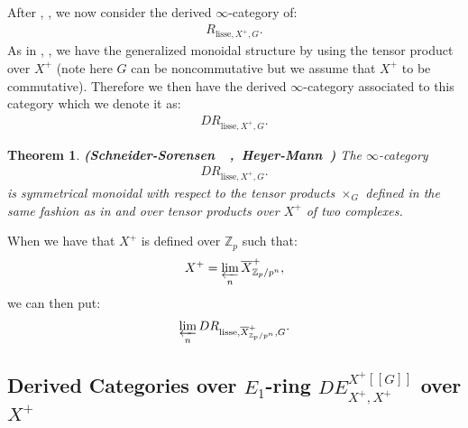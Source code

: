 \documentclass[12pt]{article}
\newtheorem{theorem}{Theorem}
\theoremstyle{definition}
\begin{document}
\noindent After \cite{SS1}, \cite{SS2}, \cite{HM} we now consider the derived $\infty$-category of:
\begin{align}
R_{\mathrm{lisse},X^+,G}.
\end{align}
As in \cite{SS1}, \cite{SS2}, \cite{HM} we have the generalized monoidal structure by using the tensor product over $X^+$ (note here $G$ can be noncommutative but we assume that $X^+$ to be commutative). Therefore we then have the derived $\infty$-category associated to this category which we denote it as:
\begin{align}
DR_{\mathrm{lisse},X^+,G}.
\end{align}



\begin{theorem}\mbox{\textbf{(Schneider-Sorensen \cite{SS1} \cite{SS2}, Heyer-Mann \cite{HM})}}
The $\infty$-category 
\begin{align}
DR_{\mathrm{lisse},X^+,G}.
\end{align}
is symmetrical monoidal with respect to the tensor products $\times_{G}$ defined in the same fashion as in \cite{SS1} and \cite{SS2} over tensor products over $X^+$ of two complexes. 
\end{theorem}


\indent When we have that $X^+$ is defined over $\mathbb{Z}_p$ such that:
\begin{align}
X^+ = \varprojlim_{n} \overline{X}^+_{\mathbb{Z}_p/p^n},
\end{align}
we can then put:
\begin{align}
\varprojlim_n DR_{\mathrm{lisse},\overline{X}^+_{\mathbb{Z}_p/p^n},G}.
\end{align}


\subsection{Derived Categories over $E_1$-ring $DE^{X^+[[G]]}_{X^+,X^+}$ over $X^+$}
\end{document}
